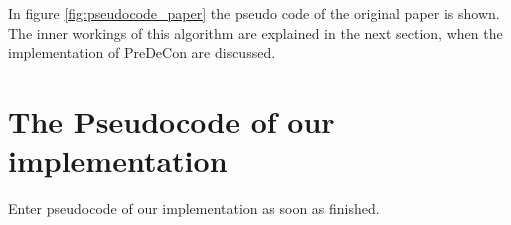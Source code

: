 \documentclass[a4paper]{article}
\begin{document}
In figure \ref{fig:pseudocode_paper} the pseudo code of the original paper is shown. The inner workings of this algorithm are explained in the next section, when the implementation of PreDeCon are discussed.



\section{The Pseudocode of our implementation}


Enter pseudocode of our implementation as soon as finished.



\end{document}
